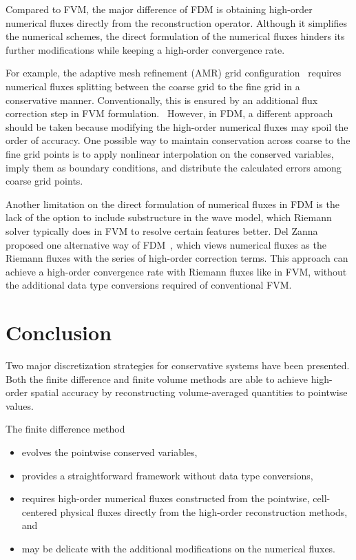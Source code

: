 Compared to FVM, the major difference of FDM is obtaining high-order numerical fluxes
directly from the reconstruction operator.
Although it simplifies the numerical schemes, the direct formulation of the numerical fluxes
hinders its further modifications while keeping a high-order convergence rate.

For example, the adaptive mesh refinement (AMR) grid configuration~\cite{berger1989local,berger1998adaptive}
requires numerical fluxes splitting between the coarse grid to the fine grid in a conservative manner.
Conventionally, this is ensured by an additional flux correction step in FVM formulation.~\cite{berger1998adaptive}
However, in FDM, a different approach should be taken because modifying the high-order numerical fluxes
may spoil the order of accuracy.
One possible way to maintain conservation across coarse to the fine grid points
is to apply nonlinear interpolation on the conserved variables, imply them as boundary conditions,
and distribute the calculated errors among coarse grid points.~\cite{shen2011adaptive}

Another limitation on the direct formulation of numerical fluxes in FDM is
the lack of the option to include substructure in the wave model,
which Riemann solver typically does in FVM to resolve certain features better.
Del Zanna proposed one alternative way of FDM~\cite{del2003efficient,del2007echo},
which views numerical fluxes as the Riemann fluxes with the series of high-order correction terms.
This approach can achieve a high-order convergence rate with Riemann fluxes like in FVM,
without the additional data type conversions required of conventional FVM.~\cite{reyes2019variable}

\section{Conclusion}\label{sec:discrete_conclusion}

Two major discretization strategies for conservative systems have been presented.
Both the finite difference and finite volume methods are able to achieve
high-order spatial accuracy by reconstructing volume-averaged quantities to pointwise values.

The finite difference method
\begin{itemize}
    \item evolves the pointwise conserved variables,
    \item provides a straightforward framework without data type conversions,
    \item requires high-order numerical fluxes constructed from the pointwise, cell-centered physical fluxes directly from the high-order reconstruction methods, and
    \item may be delicate with the additional modifications on the numerical fluxes.
\end{itemize}

